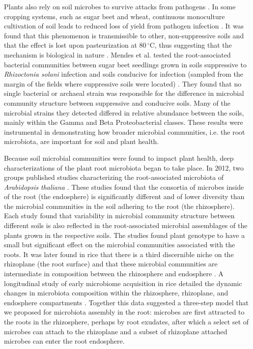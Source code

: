 Plants also rely on soil microbes to survive attacks from pathogens \cite{Berendsen2012,Bulgarelli2012}. In some cropping systems, such as sugar beet and wheat, continuous monoculture cultivation of soil leads to reduced loss of yield from pathogen infection \cite{Hornby1983}. It was found that this phenomenon is transmissible to other, non-suppressive soils and that the effect is lost upon pasteurization at $80\,^{\circ}\mathrm{C}$, thus suggesting that the mechanism is biological in nature \cite{Hornby1983}. Mendes et al. tested the root-associated bacterial communities between sugar beet seedlings grown in soils suppressive to \textit{Rhizoctonia solani} infection and soils conducive for infection (sampled from the margin of the fields where suppressive soils were located) \cite{Mendes2011}. They found that no single bacterial or archaeal strain was responsible for the difference in microbial community structure between suppressive and conducive soils. Many of the microbial strains they detected differed in relative abundance between the soils, mainly within the Gamma and Beta Proteobacterial classes. These results were instrumental in demonstrating how broader microbial communities, i.e. the root microbiota, are important for soil and plant health.

Because soil microbial communities were found to impact plant health, deep characterizations of the plant root microbiota began to take place. In 2012, two groups published studies characterizing the root-associated microbiota of \textit{Arabidopsis thaliana} \cite{Bulgarelli2012,Lundberg2012,}. These studies found that the consortia of microbes inside of the root (the endosphere) is significantly different and of lower diversity than the microbial communities in the soil adhering to the root (the rhizosphere). Each study found that variability in microbial community structure between different soils is also reflected in the root-associated microbial assemblages of the plants grown in the respective soils. The studies found plant genotype to have a small but significant effect on the microbial communities associated with the roots. It was later found in rice that there is a third discernible niche on the rhizoplane (the root surface) and that these microbial communities are intermediate in composition between the rhizosphere and endosphere \cite{Edwards2015}. A longitudinal study of early microbiome acquisition in rice detailed the dynamic changes in microbiota composition within the rhizosphere, rhizoplane, and endosphere compartments \cite{Edwards2015}. Together this data suggested a three-step model that we proposed \cite{Edwards2015} for microbiota assembly in the root: microbes are first attracted to the roots in the rhizosphere, perhaps by root exudates, after which a select set of microbes can attach to the rhizoplane and a subset of rhizoplane attached microbes can enter the root endosphere.

